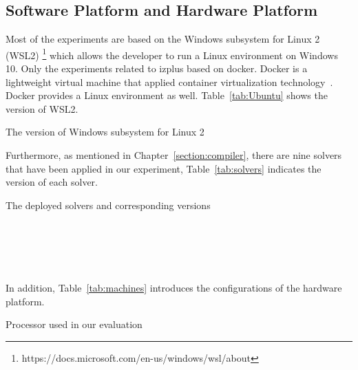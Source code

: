 \subsection{Software Platform and Hardware Platform}
\label{sec:softplat}
Most of the experiments are based on the Windows subsystem for Linux 2 (WSL2) \footnote{https://docs.microsoft.com/en-us/windows/wsl/about} which allows the developer to run a Linux environment on Windows 10. Only the experiments related to izplus based on docker. Docker is a lightweight virtual machine that applied container virtualization technology~\cite{r25}. Docker provides a Linux environment as well. Table~\ref{tab:Ubuntu} shows the version of WSL2.
\begin{table}[htbp]
  \centering

  \caption{The version of Windows subsystem for Linux 2}
  
  \label{tab:Ubuntu}
  
\end{table}
Furthermore, as mentioned in Chapter~\ref{section:compiler}, there are nine solvers that have been applied in our experiment, Table~\ref{tab:solvers} indicates the version of each solver.
\begin{table}[htbp]
  \centering

  \caption{The deployed solvers and corresponding versions}
  
  \label{tab:solvers}
  	\begin{subtable}[b]{\textwidth}
  	\centering
  
    \end{subtable}\\
    	\begin{subtable}[b]{\textwidth}
  	\centering
  
  \end{subtable}\\
  \begin{subtable}[b]{\textwidth}
  \centering
  
  \end{subtable}
\end{table}
\\In addition, Table~\ref{tab:machines} introduces the configurations of the hardware platform.
\begin{table}[H]
  \centering

  \caption{Processor used in our evaluation}
  
  \label{tab:machines}
  
\end{table}
